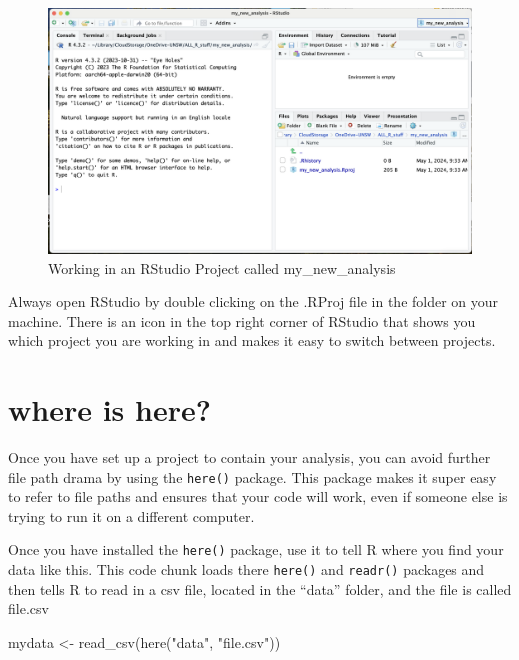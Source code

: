 \documentclass[
  letterpaper,
  DIV=11,
  numbers=noendperiod]{scrreprt}
\newenvironment{Shaded}{\begin{snugshade}}{\end{snugshade}}
\newcommand{\FunctionTok}[1]{\textcolor[rgb]{0.28,0.35,0.67}{#1}}
\newcommand{\NormalTok}[1]{\textcolor[rgb]{0.00,0.23,0.31}{#1}}
\newcommand{\OtherTok}[1]{\textcolor[rgb]{0.00,0.23,0.31}{#1}}
\newcommand{\StringTok}[1]{\textcolor[rgb]{0.13,0.47,0.30}{#1}}
\begin{document}
\begin{figure}[H]

{\centering \includegraphics{images/project.png}

}

\caption{Working in an RStudio Project called my\_new\_analysis}

\end{figure}%

Always open RStudio by double clicking on the .RProj file in the folder
on your machine. There is an icon in the top right corner of RStudio
that shows you which project you are working in and makes it easy to
switch between projects.

\section{where is here?}\label{where-is-here}

Once you have set up a project to contain your analysis, you can avoid
further file path drama by using the \texttt{here()} package. This
package makes it super easy to refer to file paths and ensures that your
code will work, even if someone else is trying to run it on a different
computer.

Once you have installed the \texttt{here()} package, use it to tell R
where you find your data like this. This code chunk loads there
\texttt{here()} and \texttt{readr()} packages and then tells R to read
in a csv file, located in the ``data'' folder, and the file is called
file.csv

\begin{Shaded}
\begin{Highlighting}[]
\NormalTok{mydata }\OtherTok{\textless{}{-}} \FunctionTok{read\_csv}\NormalTok{(}\FunctionTok{here}\NormalTok{(}\StringTok{"data"}\NormalTok{, }\StringTok{"file.csv"}\NormalTok{))}
\end{Highlighting}
\end{Shaded}
\end{document}
